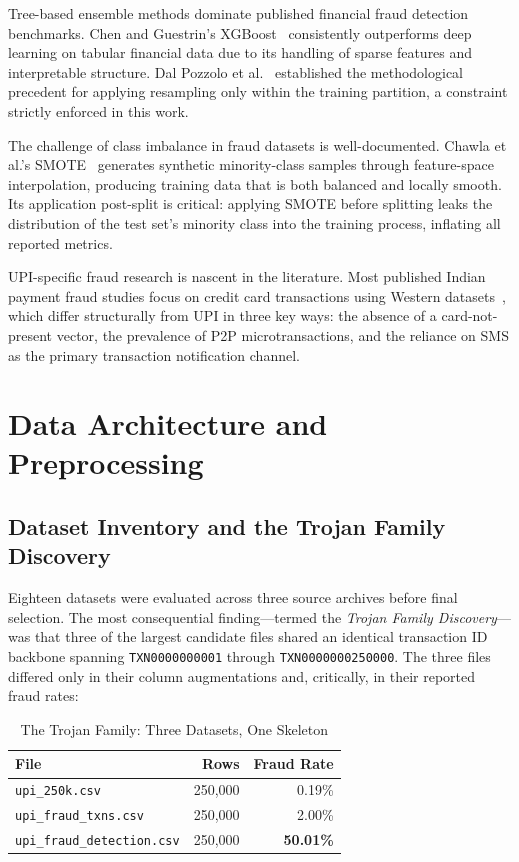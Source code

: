 \documentclass[conference]{IEEEtran}
\begin{document}
Tree-based ensemble methods dominate published financial fraud detection
benchmarks. Chen and Guestrin's XGBoost~\cite{xgboost2016} consistently
outperforms deep learning on tabular financial data due to its handling of
sparse features and interpretable structure. Dal Pozzolo et al.~\cite{dal2015}
established the methodological precedent for applying resampling only within
the training partition, a constraint strictly enforced in this work.

The challenge of class imbalance in fraud datasets is well-documented.
Chawla et al.'s SMOTE~\cite{smote2002} generates synthetic minority-class
samples through feature-space interpolation, producing training data that is
both balanced and locally smooth. Its application post-split is critical:
applying SMOTE before splitting leaks the distribution of the test set's
minority class into the training process, inflating all reported metrics.

UPI-specific fraud research is nascent in the literature. Most published
Indian payment fraud studies focus on credit card transactions using
Western datasets~\cite{eurocard2019}, which differ structurally from UPI
in three key ways: the absence of a card-not-present vector, the
prevalence of P2P microtransactions, and the reliance on SMS as the
primary transaction notification channel.

\section{Data Architecture and Preprocessing}

\subsection{Dataset Inventory and the Trojan Family Discovery}

Eighteen datasets were evaluated across three source archives before
final selection. The most consequential finding---termed the
\textit{Trojan Family Discovery}---was that three of the largest candidate
files shared an identical transaction ID backbone spanning
\texttt{TXN0000000001} through \texttt{TXN0000000250000}. The three files
differed only in their column augmentations and, critically, in their
reported fraud rates:

\begin{table}[H]
\centering
\caption{The Trojan Family: Three Datasets, One Skeleton}
\label{tab:trojan}
\begin{tabular}{@{}lrr@{}}
\toprule
File & Rows & Fraud Rate \\
\midrule
\texttt{upi\_250k.csv}           & 250{,}000 & 0.19\% \\
\texttt{upi\_fraud\_txns.csv}    & 250{,}000 & 2.00\% \\
\texttt{upi\_fraud\_detection.csv} & 250{,}000 & \textbf{50.01\%} \\
\bottomrule
\end{tabular}
\end{table}
\end{document}

